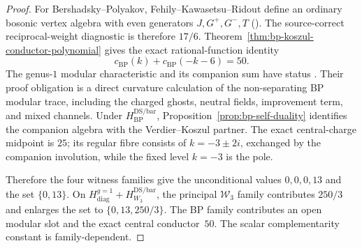 \begin{proof}
For Bershadsky--Polyakov, Fehily--Kawasetsu--Ridout define an ordinary
bosonic vertex algebra with even generators $J,G^+,G^-,T$
\textup{(}\cite[\S2.1]{FKR20}\textup{)}.  The source-correct
reciprocal-weight diagnostic is therefore $17/6$.  Theorem~\ref{thm:bp-koszul-conductor-polynomial}
gives the exact rational-function identity
\[
 c_{\mathrm{BP}}(k)+c_{\mathrm{BP}}(-k-6)=50.
\]
The genus-$1$ modular characteristic and its companion sum have status
\ClaimStatusOpen.  Their proof obligation is a direct curvature
calculation of the non-separating BP modular trace, including the
charged ghosts, neutral fields, improvement term, and mixed channels.
Under $H_{\mathrm{BP}}^{\mathrm{DS/bar}}$,
Proposition~\ref{prop:bp-self-duality} identifies the companion algebra
with the Verdier--Koszul partner.  The exact central-charge midpoint is
$25$; its regular fibre consists of $k=-3\pm2i$, exchanged by the
companion involution, while the fixed level $k=-3$ is the pole.

Therefore the four witness families give the unconditional values
$0,0,0,13$ and the set $\{0,13\}$.  On
$H_{\mathrm{diag}}^{g=1}+H_{W_3}^{\mathrm{DS/bar}}$, the principal
$\mathcal{W}_3$ family contributes $250/3$ and enlarges the set to
$\{0,13,250/3\}$.  The BP family contributes an open modular slot and
the exact central conductor~$50$.  The scalar complementarity constant
is family-dependent.
\end{proof}

